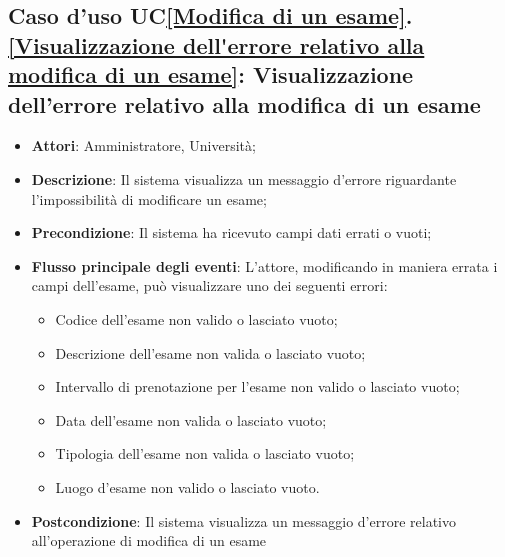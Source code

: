 \subsection{Caso d'uso UC\ref{Modifica di un esame}.\ref{Visualizzazione dell'errore relativo alla modifica di un esame}: Visualizzazione dell'errore relativo alla modifica di un esame}
\begin{itemize}
	\item \textbf{Attori}: Amministratore, Università;
	\item \textbf{Descrizione}: Il sistema visualizza un messaggio d'errore riguardante l'impossibilità di modificare un esame;
	
	\item \textbf{Precondizione}: Il sistema ha ricevuto campi dati errati o vuoti;
	
	
	\item \textbf{Flusso principale degli eventi}: L'attore, modificando in maniera errata i campi dell'esame, può visualizzare uno dei seguenti errori: 
	\begin{itemize} 
		\item Codice dell'esame non valido o lasciato vuoto; 
		\item Descrizione dell'esame non valida o lasciato vuoto; 
		\item Intervallo di prenotazione per l'esame non valido o lasciato vuoto; 
		\item Data dell'esame non valida o lasciato vuoto; 
		\item Tipologia dell'esame non valida o lasciato vuoto; 
		\item Luogo d'esame non valido o lasciato vuoto.
	\end{itemize}
	\item \textbf{Postcondizione}: Il sistema visualizza un messaggio d'errore relativo all'operazione di modifica di un esame
	
	
\end{itemize}



